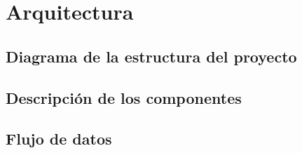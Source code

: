 	\section{Arquitectura}
	\subsection{Diagrama de la estructura del proyecto}
	\subsection{Descripci\'on de los componentes}
	\subsection{Flujo de datos}